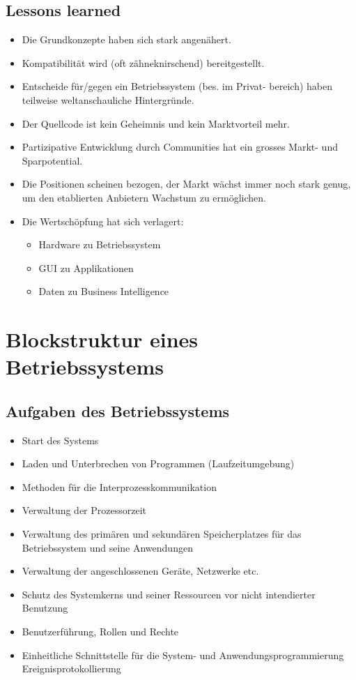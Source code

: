 \documentclass[a4paper, 10pt]{article}
\begin{document}
\subsection{Lessons learned}
\begin{itemize}


\item Die Grundkonzepte haben sich stark angen\"ahert.
\item Kompatibilit\"at wird (oft z\"ahneknirschend) bereitgestellt.
\item Entscheide f\"ur/gegen ein Betriebssystem (bes. im Privat-
bereich) haben teilweise weltanschauliche Hintergr\"unde.
\item Der Quellcode ist kein Geheimnis und kein Marktvorteil mehr.
\item Partizipative Entwicklung durch Communities hat ein grosses
Markt- und Sparpotential.
\item Die Positionen scheinen bezogen, der Markt w\"achst immer
noch stark genug, um den etablierten Anbietern Wachstum zu
erm\"oglichen.
\item Die Wertsch\"opfung hat sich verlagert:
\begin{itemize}
\item Hardware zu Betriebssystem
\item GUI zu Applikationen
\item Daten zu Business Intelligence
\end{itemize}
\end{itemize}
\newpage

\section{Blockstruktur eines Betriebssystems}
\subsection{Aufgaben des Betriebssystems}
\begin{itemize}
\item Start des Systems
\item Laden und Unterbrechen von Programmen (Laufzeitumgebung)
\item Methoden f\"ur die Interprozesskommunikation
\item Verwaltung der Prozessorzeit
\item Verwaltung des prim\"aren und sekund\"aren Speicherplatzes f\"ur das Betriebssystem und seine Anwendungen
\item Verwaltung der angeschlossenen Ger\"ate, Netzwerke etc.
\item Schutz des Systemkerns und seiner Ressourcen vor nicht intendierter Benutzung
\item Benutzerf\"uhrung, Rollen und Rechte
\item Einheitliche Schnittstelle f\"ur die System- und Anwendungsprogrammierung Ereignisprotokollierung

\end{itemize}
\end{document}
